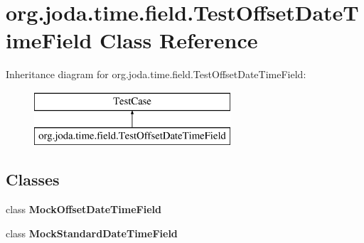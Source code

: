 \hypertarget{classorg_1_1joda_1_1time_1_1field_1_1_test_offset_date_time_field}{\section{org.\-joda.\-time.\-field.\-Test\-Offset\-Date\-Time\-Field Class Reference}
\label{classorg_1_1joda_1_1time_1_1field_1_1_test_offset_date_time_field}
}
Inheritance diagram for org.\-joda.\-time.\-field.\-Test\-Offset\-Date\-Time\-Field\-:\begin{figure}[H]
\begin{center}
\leavevmode
\includegraphics[height=2.000000cm]{classorg_1_1joda_1_1time_1_1field_1_1_test_offset_date_time_field}
\end{center}
\end{figure}
\subsection*{Classes}
\begin{DoxyCompactItemize}
\item 
class {\bfseries Mock\-Offset\-Date\-Time\-Field}
\item 
class {\bfseries Mock\-Standard\-Date\-Time\-Field}
\end{DoxyCompactItemize}

